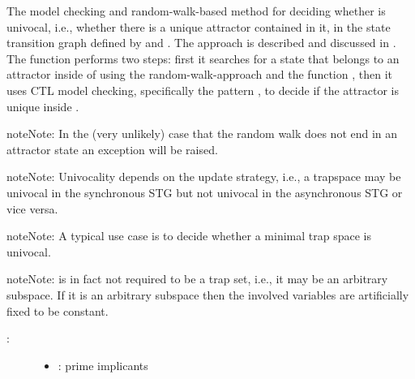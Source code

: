 \documentclass[letterpaper,10pt,english]{sphinxmanual}
\begin{document}
\begin{fulllineitems}
\label{\detokenize{AttractorDetection:PyBoolNet.AttractorDetection.univocality}}
The model checking and random-walk-based method for deciding whether  is univocal,
i.e., whether there is a unique attractor contained in it,
in the state transition graph defined by  and .
The approach is described and discussed in {\hyperref[\detokenize{Bibliography:klarner2015trap}]{}}.
The function performs two steps: first it searches for a state that belongs to an attractor inside of  using
the random-walk-approach and the function {\hyperref[\detokenize{StateTransitionGraphs:random-walk}]{}},
then it uses CTL model checking, specifically the pattern ,
to decide if the attractor is unique inside .

\begin{sphinxadmonition}{note}{Note:}
In the (very unlikely) case that the random walk does not end in an attractor state an exception will be raised.
\end{sphinxadmonition}

\begin{sphinxadmonition}{note}{Note:}
Univocality depends on the update strategy, i.e.,
a trapspace may be univocal in the synchronous STG but not univocal in the asynchronous STG or vice versa.
\end{sphinxadmonition}

\begin{sphinxadmonition}{note}{Note:}
A typical use case is to decide whether a minimal trap space is univocal.
\end{sphinxadmonition}

\begin{sphinxadmonition}{note}{Note:}
 is in fact not required to be a trap set, i.e., it may be an arbitrary subspace.
If it is an arbitrary subspace then the involved variables are artificially fixed to be constant.
\end{sphinxadmonition}
\begin{description}
\item[{:}] \leavevmode\begin{itemize}
\item {} 
: prime implicants


\end{itemize}
\end{description}
\end{fulllineitems}
\end{document}
